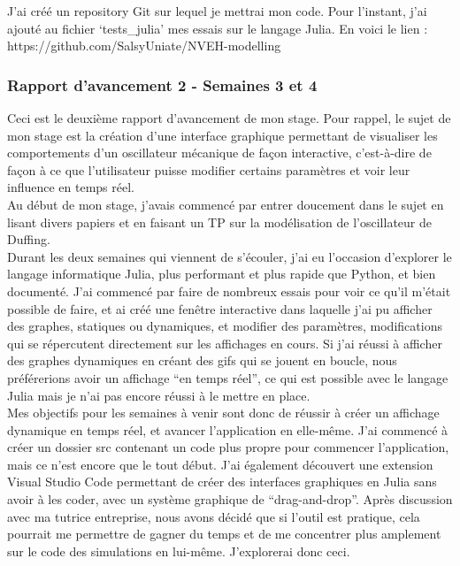 \documentclass[a4paper, french, 12pt, titlepage]{article}
\begin{document}
J'ai créé un repository Git sur lequel je mettrai mon code. Pour l'instant, j'ai ajouté au fichier ‘tests\_julia' mes essais sur le langage Julia. En voici le lien : https://github.com/SalsyUniate/NVEH-modelling


\subsubsection*{Rapport d'avancement 2 - Semaines 3 et 4}

Ceci est le deuxième rapport d'avancement de mon stage. Pour rappel, le sujet de mon stage est la création d'une interface graphique permettant de visualiser les comportements d'un oscillateur mécanique de façon interactive, c'est-à-dire de façon à ce que l'utilisateur puisse modifier certains paramètres et voir leur influence en temps réel. \\

Au début de mon stage, j'avais commencé par entrer doucement dans le sujet en lisant divers papiers et en faisant un TP sur la modélisation de l'oscillateur de Duffing. \\

Durant les deux semaines qui viennent de s'écouler, j'ai eu l'occasion d'explorer le langage informatique Julia, plus performant et plus rapide que Python, et bien documenté. J'ai commencé par faire de nombreux essais pour voir ce qu'il m'était possible de faire, et ai créé une fenêtre interactive dans laquelle j'ai pu afficher des graphes, statiques ou dynamiques, et modifier des paramètres, modifications qui se répercutent directement sur les affichages en cours. Si j'ai réussi à afficher des graphes dynamiques en créant des gifs qui se jouent en boucle, nous préférerions avoir un affichage “en temps réel”, ce qui est possible avec le langage Julia mais je n'ai pas encore réussi à le mettre en place. \\

Mes objectifs pour les semaines à venir sont donc de réussir à créer un affichage dynamique en temps réel, et avancer l'application en elle-même. J'ai commencé à créer un dossier src contenant un code plus propre pour commencer l'application, mais ce n'est encore que le tout début. J'ai également découvert une extension Visual Studio Code permettant de créer des interfaces graphiques en Julia sans avoir à les coder, avec un système graphique de “drag-and-drop”. Après discussion avec ma tutrice entreprise, nous avons décidé que si l'outil est pratique, cela pourrait me permettre de gagner du temps et de me concentrer plus amplement sur le code des simulations en lui-même. J'explorerai donc ceci. \\
\end{document}
